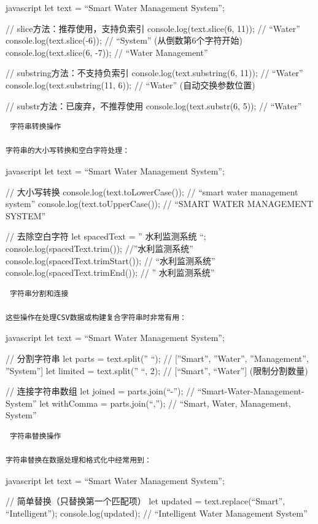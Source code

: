 javascript let text = ``Smart Water Management System'';

// slice方法：推荐使用，支持负索引 console.log(text.slice(6, 11)); // ``Water'' console.log(text.slice(-6)); // ``System'' (从倒数第6个字符开始) console.log(text.slice(6, -7)); // ``Water Management''

// substring方法：不支持负索引 console.log(text.substring(6, 11)); // ``Water'' console.log(text.substring(11, 6)); // ``Water'' (自动交换参数位置)

// substr方法：已废弃，不推荐使用 console.log(text.substr(6, 5)); // ``Water''

\begin{lstlisting}
 字符串转换操作

字符串的大小写转换和空白字符处理：
\end{lstlisting}

javascript let text = ``Smart Water Management System'';

// 大小写转换 console.log(text.toLowerCase()); // ``smart water management system'' console.log(text.toUpperCase()); // ``SMART WATER MANAGEMENT SYSTEM''

// 去除空白字符 let spacedText = '' 水利监测系统 ``; console.log(spacedText.trim()); //''水利监测系统'' console.log(spacedText.trimStart()); // ``水利监测系统'' console.log(spacedText.trimEnd()); // '' 水利监测系统''

\begin{lstlisting}
 字符串分割和连接

这些操作在处理CSV数据或构建复合字符串时非常有用：
\end{lstlisting}

javascript let text = ``Smart Water Management System'';

// 分割字符串 let parts = text.split('' ``); // {[}''Smart'', ''Water'', ''Management'', ''System''{]} let limited = text.split('' ``, 2); // {[}``Smart'', ``Water''{]} (限制分割数量)

// 连接字符串数组 let joined = parts.join(``-''); // ``Smart-Water-Management-System'' let withComma = parts.join(``,''); // ``Smart, Water, Management, System''

\begin{lstlisting}
 字符串替换操作

字符串替换在数据处理和格式化中经常用到：
\end{lstlisting}

javascript let text = ``Smart Water Management System'';

// 简单替换（只替换第一个匹配项） let updated = text.replace(``Smart'', ``Intelligent''); console.log(updated); // ``Intelligent Water Management System''

